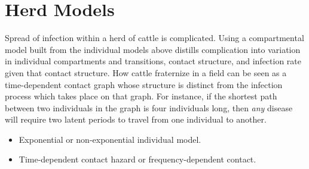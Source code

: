 \documentclass{article}
\begin{document}
\section{Herd Models}
Spread of infection within a herd of cattle is complicated.
Using a compartmental model built from the individual
models above distills complication into variation in
individual compartments and transitions, contact structure,
and infection rate given that contact structure.
How cattle fraternize in a field can be seen as a
time-dependent contact graph whose structure is 
distinct from the infection process which takes place
on that graph. For instance, if the shortest path between
two individuals in the graph is four individuals long, then
\emph{any\/} disease will require two latent periods
to travel from one individual to another.

\begin{itemize}
  \item Exponential or non-exponential individual model.
  \item Time-dependent contact hazard or frequency-dependent contact.
\end{itemize}



\end{document}
